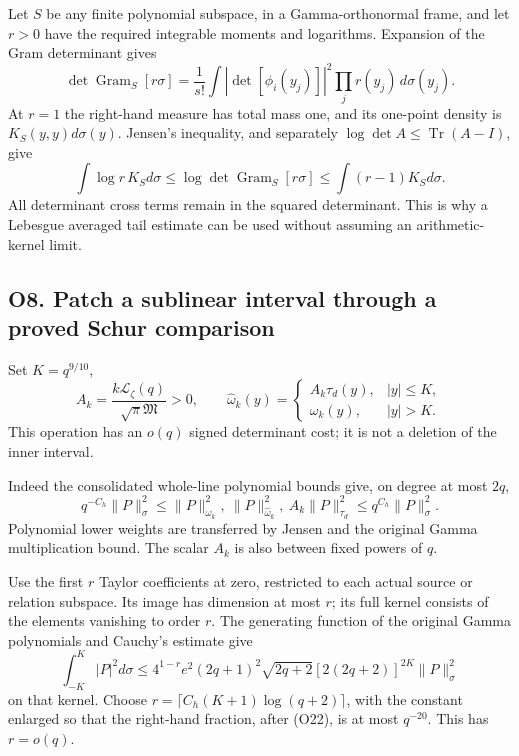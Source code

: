 \documentclass[11pt,a4paper]{article}
\begin{document}
Let \(S\) be any finite polynomial subspace, in a Gamma-orthonormal
frame, and let \(r>0\) have the required integrable moments and
logarithms. Expansion of the Gram determinant gives \[
\det\operatorname{Gram}_S[r\sigma]
=\frac1{s!}\int |\det[\phi_i(y_j)]|^2\prod_jr(y_j)\,d\sigma(y_j).
\] At \(r=1\) the right-hand measure has total mass one, and its
one-point density is \(K_S(y,y)d\sigma(y)\). Jensen's inequality, and
separately \(\log\det A\le\operatorname{Tr}(A-I)\), give \[
\boxed{\int\log r\,K_Sd\sigma
\le\log\det\operatorname{Gram}_S[r\sigma]
\le\int(r-1)K_Sd\sigma.}\tag{O20}
\] All determinant cross terms remain in the squared determinant. This
is why a Lebesgue averaged tail estimate can be used without assuming an
arithmetic-kernel limit.

\subsection{O8. Patch a sublinear interval through a proved Schur
comparison}\label{sa:o8.-patch-a-sublinear-interval-through-a-proved-schur-comparison}

Set \(K=q^{9/10}\), \[
A_k=\frac{k\mathcal L_\zeta(q)}{\sqrt\pi\mathfrak M}>0,
\qquad
\widehat\omega_k(y)=\begin{cases}A_k\tau_d(y),&|y|\le K,\\
\omega_k(y),&|y|>K.
\end{cases}\tag{O21}
\] This operation has an \(o(q)\) signed determinant cost; it is not a
deletion of the inner interval.

Indeed the consolidated whole-line polynomial bounds give, on degree at
most \(2q\), \[
q^{-C_h}\|P\|_\sigma^2\le
\|P\|_{\omega_k}^2,\ \|P\|_{\widehat\omega_k}^2,
\ A_k\|P\|_{\tau_d}^2
\le q^{C_h}\|P\|_\sigma^2.\tag{O22}
\] Polynomial lower weights are transferred by Jensen and the original
Gamma multiplication bound. The scalar \(A_k\) is also between fixed
powers of \(q\).

Use the first \(r\) Taylor coefficients at zero, restricted to each
actual source or relation subspace. Its image has dimension at most
\(r\); its full kernel consists of the elements vanishing to order
\(r\). The generating function of the original Gamma polynomials and
Cauchy's estimate give \[
\int_{-K}^{K}|P|^2d\sigma
\le4^{1-r}e^2(2q+1)^2\sqrt{2q+2}
[2(2q+2)]^{2K}\|P\|_\sigma^2
\tag{O23}
\] on that kernel. Choose \(r=\lceil C_h(K+1)\log(q+2)\rceil\), with the
constant enlarged so that the right-hand fraction, after (O22), is at
most \(q^{-20}\). This has \(r=o(q)\).
\end{document}
